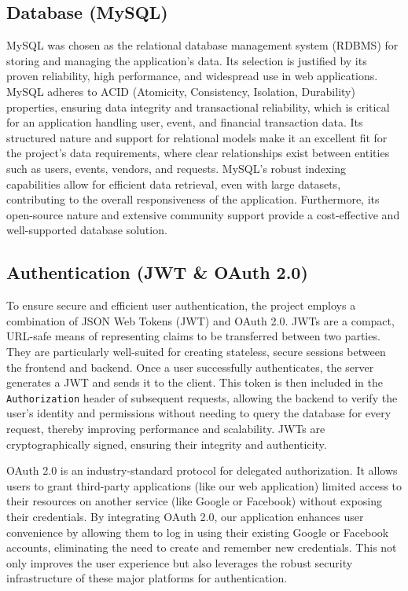 \documentclass{report}
\begin{document}
\subsection{Database (MySQL)}
MySQL was chosen as the relational database management system (RDBMS) for storing and managing the application's data. Its selection is justified by its proven reliability, high performance, and widespread use in web applications. MySQL adheres to ACID (Atomicity, Consistency, Isolation, Durability) properties, ensuring data integrity and transactional reliability, which is critical for an application handling user, event, and financial transaction data. Its structured nature and support for relational models make it an excellent fit for the project's data requirements, where clear relationships exist between entities such as users, events, vendors, and requests. MySQL's robust indexing capabilities allow for efficient data retrieval, even with large datasets, contributing to the overall responsiveness of the application. Furthermore, its open-source nature and extensive community support provide a cost-effective and well-supported database solution.

\subsection{Authentication (JWT \& OAuth 2.0)}
To ensure secure and efficient user authentication, the project employs a combination of JSON Web Tokens (JWT) and OAuth 2.0. JWTs are a compact, URL-safe means of representing claims to be transferred between two parties. They are particularly well-suited for creating stateless, secure sessions between the frontend and backend. Once a user successfully authenticates, the server generates a JWT and sends it to the client. This token is then included in the \texttt{Authorization} header of subsequent requests, allowing the backend to verify the user's identity and permissions without needing to query the database for every request, thereby improving performance and scalability. JWTs are cryptographically signed, ensuring their integrity and authenticity.

OAuth 2.0 is an industry-standard protocol for delegated authorization. It allows users to grant third-party applications (like our web application) limited access to their resources on another service (like Google or Facebook) without exposing their credentials. By integrating OAuth 2.0, our application enhances user convenience by allowing them to log in using their existing Google or Facebook accounts, eliminating the need to create and remember new credentials. This not only improves the user experience but also leverages the robust security infrastructure of these major platforms for authentication.
\end{document}
